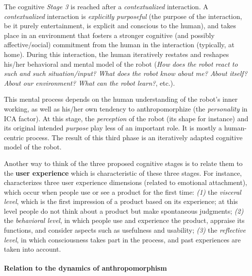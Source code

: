 \documentclass{frontiersSCNS} %
\begin{document}
The cognitive \emph{Stage 3} is reached after a \emph{contextualized} interaction.
A \emph{contextualized} interaction is \emph{explicitly purposeful} (the purpose
of the interaction, be it purely entertainment, is explicit and conscious to the
human), and takes place in an environment that fosters a stronger cognitive (and
possibly affective/social) commitment from the human in the interaction
(typically, at home). During this interaction, the human iteratively restates
and reshapes his/her behavioral and mental model of the robot (\emph{How does
the robot react to such and such situation/input?  What does the robot know
about me? About itself? About our environment? What can the robot learn?}, etc.).

This mental process depends on the human understanding of the robot's inner
working, as well as his/her own tendency to anthropomorphize (the
\emph{personality} in ICA factor). At this stage, the \emph{perception} of the
robot (its shape for instance) and its original intended \emph{purpose} play
less of an important role. It is mostly a human-centric process.  The result of
this third phase is an iteratively adapted cognitive model of the robot.

Another way to think of the three proposed cognitive stages is to relate them to
the \textbf{user experience} which is characteristic of these three stages. For
instance, \cite{norman_emotional_2003} characterizes  three user experience
dimensions (related to emotional attachment), which occur when people use or see
a product for the first time: \emph{(1)} the \emph{visceral level}, which is the
first impression of a product based on its experience; at this level people do
not think about a product but make spontaneous judgments; \emph{(2)} the
\emph{behavioral level}, in which people use and experience the product,
appraise its functions, and consider aspects such as usefulness and usability;
\emph{(3)} the \emph{reflective level}, in which consciousness takes part in the
process, and past experiences are taken into account.

\paragraph{Relation to the dynamics of anthropomorphism\\}
\end{document}
